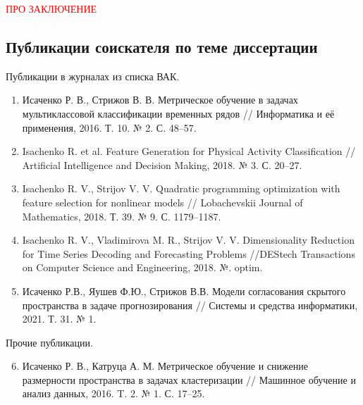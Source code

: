 \documentclass[11pt, a5paper]{dissert}
\begin{document}
\textcolor{red}{ПРО ЗАКЛЮЧЕНИЕ}

\subsection*{Публикации соискателя по теме диссертации}
Публикации в журналах из списка ВАК.
\vspace{0.3cm}
\begin{enumerate}
	\item Исаченко Р. В., Стрижов В. В. Метрическое обучение в задачах мультиклассовой классификации временных рядов // Информатика и её применения, 2016. Т. 10. № 2. С. 48--57.
	\item Isachenko R. et al. Feature Generation for Physical Activity Classification // Artificial Intelligence and Decision Making, 2018. № 3. С. 20--27.
	\item Isachenko R. V., Strijov V. V. Quadratic programming optimization with feature selection for nonlinear models // Lobachevskii Journal of Mathematics, 2018. Т. 39. № 9. С. 1179--1187.
	\item Isachenko R. V., Vladimirova M. R., Strijov V. V. Dimensionality Reduction for Time Series Decoding and Forecasting Problems //DEStech Transactions on Computer Science and Engineering, 2018. №. optim.
	\item Исаченко Р.В., Яушев Ф.Ю., Стрижов В.В. Модели согласования скрытого пространства в задаче прогнозирования // Системы и средства информатики, 2021. Т. 31. № 1.
\end{enumerate}

\vspace{0.4cm}
{Прочие публикации.}
\vspace{0.2cm}
\begin{enumerate}
\setcounter{enumi}{5}
	\item Исаченко Р. В., Катруца А. М. Метрическое обучение и снижение размерности пространства в задачах кластеризации // Машинное обучение и анализ данных, 2016. T. 2. № 1. С. 17--25.
\end{enumerate}
\end{document}
